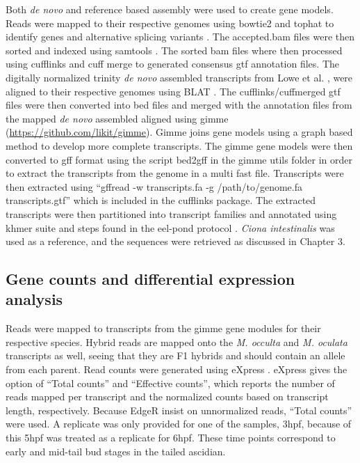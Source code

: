 Both \textit{de novo} and reference based assembly were used to create gene models. Reads were mapped to their respective genomes using bowtie2 and tophat to identify genes and alternative splicing variants \cite{langmead_fast_2012,trapnell_differential_2012}. The accepted.bam files were then sorted and indexed using samtools \cite{li_sequence_2009}. The sorted bam files where then processed using cufflinks and cuff merge to generated consensus gtf annotation files. The digitally normalized trinity \textit{de novo} assembled transcripts from Lowe et al. \cite{lowe_evaluating_2014}, were aligned to their respective genomes using BLAT \cite{haas_novo_2013}. The cufflinks/cuffmerged gtf files were then converted into bed files and merged with the annotation files from the mapped \textit{de novo} assembled aligned using gimme (\url{https://github.com/likit/gimme}). Gimme joins gene models using a graph based method to develop more complete transcripts. The gimme gene models were then converted to gff format using the script bed2gff in the gimme utils folder in order to extract the transcripts from the genome in a multi fast file. Transcripts were then extracted using ``gffread -w transcripts.fa -g /path/to/genome.fa transcripts.gtf'' which is included in the cufflinks package. The extracted transcripts were then partitioned into transcript families and annotated using khmer suite and steps found in the eel-pond protocol \cite{}. \textit{Ciona intestinalis} was used as a reference, and the sequences were retrieved as discussed in Chapter 3. 

\subsection{Gene counts and differential expression analysis}
Reads were mapped to transcripts from the gimme gene modules for their respective species. Hybrid reads are mapped onto the \textit{M. occulta} and \textit{M. oculata} transcripts as well, seeing that they are F1 hybrids and should contain an allele from each parent. Read counts were generated using eXpress \cite{roberts_streaming_2013}. eXpress gives the option of ``Total counts'' and ``Effective counts'', which reports the number of reads mapped per transcript and the normalized counts based on transcript length, respectively. Because EdgeR insist on unnormalized reads, ``Total counts'' were used. A replicate was only provided for one of the samples, 3hpf, because of this 5hpf was treated as a replicate for 6hpf. These time points correspond to early and mid-tail bud stages in the tailed ascidian. 

